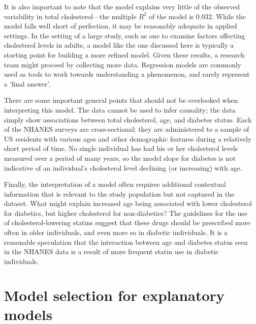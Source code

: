 
It is also important to note that the model explains very little of the observed variability in total cholesterol---the multiple $R^2$ of the model is 0.032. While the model falls well short of perfection, it may be reasonably adequate in applied settings. In the setting of a large study, such as one to examine factors affecting cholesterol levels in adults, a model like the one discussed here is typically a starting point for building a more refined model. Given these results, a research team might proceed by collecting more data. Regression models are commonly used as tools to work towards understanding a phenomenon, and rarely represent a 'final answer'.

There are some important general points that should not be overlooked when interpreting this model. The data cannot be used to infer causality; the data simply show associations between total cholesterol, age, and diabetes status. Each of the NHANES surveys are cross-sectional; they are administered to a sample of US residents with various ages and other demographic features during a relatively short period of time.  No single individual has had his or her cholesterol levels measured over a period of many years, so the model slope for diabetes is not indicative of an individual's cholesterol level declining (or increasing) with age.

Finally, the interpretation of a model often requires additional contextual information that is relevant to the study population but not captured in the dataset. What might explain increased age being associated with lower cholesterol for diabetics, but higher cholesterol for non-diabetics? The guidelines for the use of cholesterol-lowering statins suggest that these drugs should be prescribed more often in older individuals, and even more so in diabetic individuals. It is a reasonable speculation that the interaction between age and diabetes status seen in the NHANES data is a result of more frequent statin use in diabetic individuals.

\section{Model selection for explanatory models}
\label{modelSelection}


